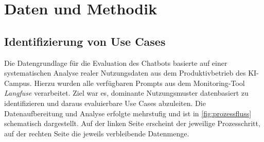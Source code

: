 \chapter{Daten und Methodik}
\label{sec:daten_methodik}
\section{Identifizierung von Use Cases}
\label{sec:use_cases}
Die Datengrundlage für die Evaluation des Chatbots basierte auf einer systematischen Analyse realer Nutzungsdaten aus dem Produktivbetrieb des KI-Campus. Hierzu wurden alle verfügbaren Prompts aus dem Monitoring-Tool \textit{Langfuse} verarbeitet. Ziel war es, dominante Nutzungsmuster datenbasiert zu identifizieren und daraus evaluierbare Use Cases abzuleiten. Die Datenaufbereitung und Analyse erfolgte mehrstufig und ist in \autoref{fig:prozessfluss} schematisch dargestellt. Auf der linken Seite erscheint der jeweilige Prozesschritt, auf der rechten Seite die jeweils verbleibende Datenmenge.

